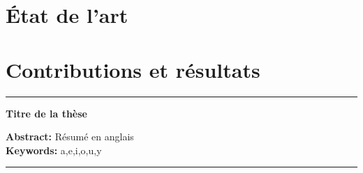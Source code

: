 \documentclass[12pt,twoside, french]{StyleThese}
\begin{document}
\printglossary[type=main]           %
\printglossary[type=\acronymtype]   %




\mainmatter

%

    
    
    \part{État de l'art}
    
    
    \part{Contributions et résultats}
    

    
    

\appendix



%
%



\begin{multicols}{2}[\printbibheading]
\printbibliography[sorting=none, heading=bibliography, heading=none]
\end{multicols}

  \printindex


\cleardoublepage

\begin{vcenterpage}
\noindent\rule[2pt]{\textwidth}{0.5pt}
\begin{center}
{\large\textbf{Titre de la thèse\\}}
\end{center}
{\large\textbf{Abstract:}}
Résumé en anglais
\\
{\large\textbf{Keywords:}}
a,e,i,o,u,y
\\
\noindent\rule[2pt]{\textwidth}{0.5pt}
\end{vcenterpage}
\end{document}
